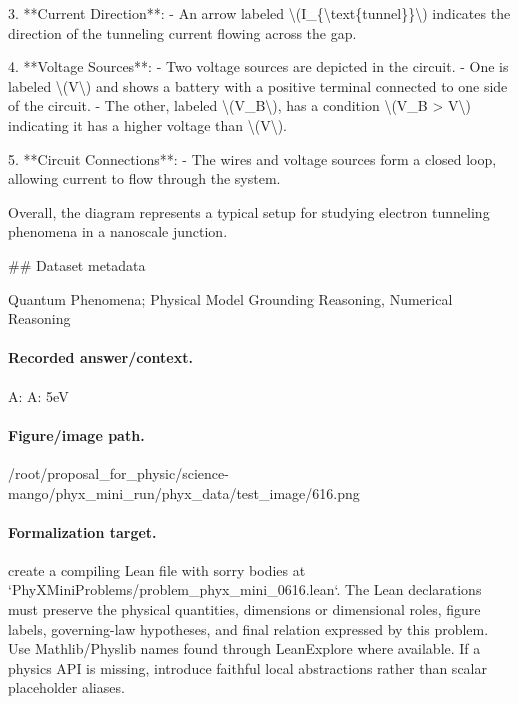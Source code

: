 3. **Current Direction**:
   - An arrow labeled \textbackslash{}(I\_\{\textbackslash{}text\{tunnel\}\}\textbackslash{}) indicates the direction of the tunneling current flowing across the gap.

4. **Voltage Sources**:
   - Two voltage sources are depicted in the circuit.
   - One is labeled \textbackslash{}(V\textbackslash{}) and shows a battery with a positive terminal connected to one side of the circuit.
   - The other, labeled \textbackslash{}(V\_B\textbackslash{}), has a condition \textbackslash{}(V\_B > V\textbackslash{}) indicating it has a higher voltage than \textbackslash{}(V\textbackslash{}).

5. **Circuit Connections**:
   - The wires and voltage sources form a closed loop, allowing current to flow through the system.

Overall, the diagram represents a typical setup for studying electron tunneling phenomena in a nanoscale junction.

\#\# Dataset metadata

Quantum Phenomena; Physical Model Grounding Reasoning, Numerical Reasoning

\paragraph{Recorded answer/context.}
A: A: 5eV

\paragraph{Figure/image path.}
/root/proposal\_for\_physic/science-mango/phyx\_mini\_run/phyx\_data/test\_image/616.png

\paragraph{Formalization target.}
create a compiling Lean file with sorry bodies at `PhyXMiniProblems/problem\_phyx\_mini\_0616.lean`. The Lean declarations must preserve the physical quantities, dimensions or dimensional roles, figure labels, governing-law hypotheses, and final relation expressed by this problem.
Use Mathlib/Physlib names found through LeanExplore where available. If a physics API is missing, introduce faithful local abstractions rather than scalar placeholder aliases.

